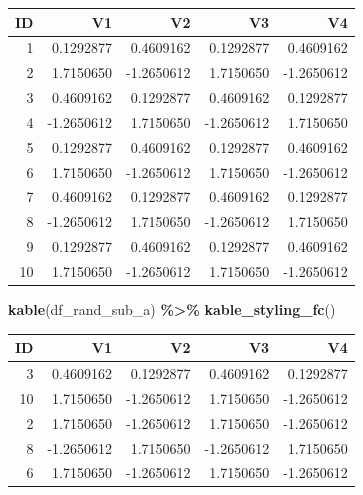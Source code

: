 \documentclass[
]{book}
\newenvironment{Shaded}{\begin{snugshade}}{\end{snugshade}}
\newcommand{\KeywordTok}[1]{\textcolor[rgb]{0.13,0.29,0.53}{\textbf{#1}}}
\newcommand{\NormalTok}[1]{#1}
\newcommand{\OperatorTok}[1]{\textcolor[rgb]{0.81,0.36,0.00}{\textbf{#1}}}
\newcommand{\StringTok}[1]{\textcolor[rgb]{0.31,0.60,0.02}{#1}}
\begin{document}
\begin{table}[!h]
\centering
\begin{tabular}{r|r|r|r|r}
\hline
ID & V1 & V2 & V3 & V4\\
\hline
\rowcolor{gray!6}  1 & 0.1292877 & 0.4609162 & 0.1292877 & 0.4609162\\
\hline
2 & 1.7150650 & -1.2650612 & 1.7150650 & -1.2650612\\
\hline
\rowcolor{gray!6}  3 & 0.4609162 & 0.1292877 & 0.4609162 & 0.1292877\\
\hline
4 & -1.2650612 & 1.7150650 & -1.2650612 & 1.7150650\\
\hline
\rowcolor{gray!6}  5 & 0.1292877 & 0.4609162 & 0.1292877 & 0.4609162\\
\hline
6 & 1.7150650 & -1.2650612 & 1.7150650 & -1.2650612\\
\hline
\rowcolor{gray!6}  7 & 0.4609162 & 0.1292877 & 0.4609162 & 0.1292877\\
\hline
8 & -1.2650612 & 1.7150650 & -1.2650612 & 1.7150650\\
\hline
\rowcolor{gray!6}  9 & 0.1292877 & 0.4609162 & 0.1292877 & 0.4609162\\
\hline
10 & 1.7150650 & -1.2650612 & 1.7150650 & -1.2650612\\
\hline
\end{tabular}
\end{table}

\begin{Shaded}
\begin{Highlighting}[]
\KeywordTok{kable}\NormalTok{(df\_rand\_sub\_a) }\OperatorTok{\%\textgreater{}\%}\StringTok{ }\KeywordTok{kable\_styling\_fc}\NormalTok{()}
\end{Highlighting}
\end{Shaded}

\begin{table}[!h]
\centering
\begin{tabular}{r|r|r|r|r}
\hline
ID & V1 & V2 & V3 & V4\\
\hline
\rowcolor{gray!6}  3 & 0.4609162 & 0.1292877 & 0.4609162 & 0.1292877\\
\hline
10 & 1.7150650 & -1.2650612 & 1.7150650 & -1.2650612\\
\hline
\rowcolor{gray!6}  2 & 1.7150650 & -1.2650612 & 1.7150650 & -1.2650612\\
\hline
8 & -1.2650612 & 1.7150650 & -1.2650612 & 1.7150650\\
\hline
\rowcolor{gray!6}  6 & 1.7150650 & -1.2650612 & 1.7150650 & -1.2650612\\
\hline
\end{tabular}
\end{table}
\end{document}
